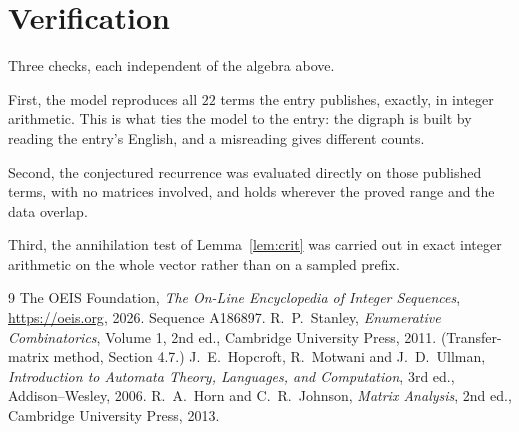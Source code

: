 \documentclass[11pt,a4paper]{article}
\theoremstyle{plain}
\theoremstyle{definition}
\begin{document}
\section{Verification}

Three checks, each independent of the algebra above.

First, the model reproduces all $22$ terms the entry publishes, exactly, in integer
arithmetic. This is what ties the model to the entry: the digraph is built by reading the
entry's English, and a misreading gives different counts.

Second, the conjectured recurrence was evaluated directly on those published terms, with no
matrices involved, and holds wherever the proved range and the data overlap.

Third, the annihilation test of Lemma~\ref{lem:crit} was carried out in exact integer
arithmetic on the whole vector rather than on a sampled prefix.

\begin{thebibliography}{9}
 The OEIS Foundation, \emph{The On-Line Encyclopedia of Integer
Sequences}, \url{https://oeis.org}, 2026. Sequence A186897.
 R.~P.~Stanley, \emph{Enumerative Combinatorics}, Volume 1, 2nd ed.,
Cambridge University Press, 2011. (Transfer-matrix method, Section 4.7.)
 J.~E.~Hopcroft, R.~Motwani and J.~D.~Ullman, \emph{Introduction to Automata
Theory, Languages, and Computation}, 3rd ed., Addison--Wesley, 2006.
 R.~A.~Horn and C.~R.~Johnson, \emph{Matrix Analysis}, 2nd ed., Cambridge
University Press, 2013.
\end{thebibliography}
\end{document}
